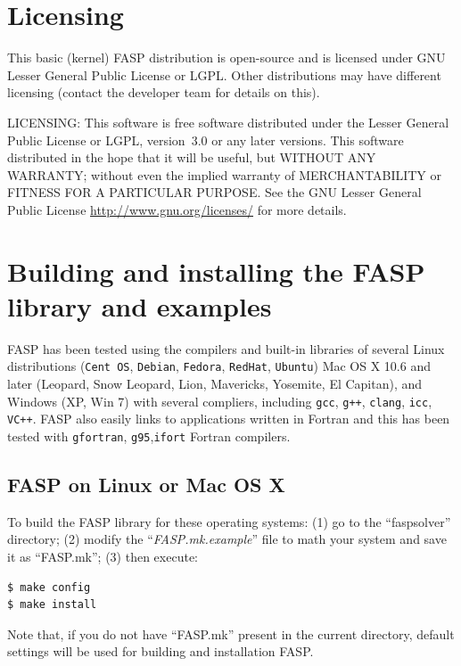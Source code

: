 \documentclass[11pt]{memoir}
\begin{document}
\section{Licensing} This basic (kernel) FASP distribution is
open-source and is licensed under GNU Lesser General Public License or
LGPL. Other distributions may have different licensing (contact the
developer team for details on this).

\begin{snugshade}\noindent
  LICENSING: This software is free software distributed under the Lesser
  General Public License or LGPL, version~3.0 or any later
  versions. This software distributed in the hope that it will be
  useful, but WITHOUT ANY WARRANTY; without even the implied warranty
  of MERCHANTABILITY or FITNESS FOR A PARTICULAR PURPOSE. See the GNU
  Lesser General Public License \url{http://www.gnu.org/licenses/} for
  more details.
\end{snugshade}



\section{Building and installing the FASP library and examples}\label{sec:build}

FASP has been tested using the compilers and built-in libraries of
several Linux distributions (\verb|Cent OS|, \verb|Debian|,
\verb|Fedora|, \verb|RedHat|, \verb|Ubuntu|) Mac OS X 10.6 and later
(Leopard, Snow Leopard, Lion, Mavericks, Yosemite, El Capitan), and
Windows (XP, Win 7) with several compliers, including \verb|gcc|,
\verb|g++|, \verb|clang|, \verb|icc|, \verb|VC++|. FASP also easily
links to applications written in Fortran and this has been tested with
\verb|gfortran|, \verb|g95|,\verb|ifort| Fortran compilers.

\subsection{FASP on Linux or Mac OS X}
To build the FASP library for these operating systems: 
(1) go to the ``faspsolver'' directory; (2) modify the ``\emph{FASP.mk.example}''
file to math your system and save it as
``{\color{red}FASP.mk}''; (3) then execute:
%
\begin{lstlisting}[numbers=none]
$ make config
$ make install
\end{lstlisting}
%
Note that, if you do not have ``FASP.mk'' present in the current
directory, default settings will be used for building and installation
FASP.
\end{document}
